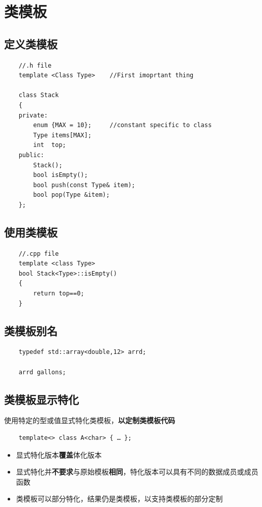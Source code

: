 \documentclass[UTF8,a4paper,12pt]{ctexbook}
\begin{document}
\section{类模板}
		\subsection{定义类模板}
			\begin{lstlisting}	
	//.h file		
	template <Class Type>    //First imoprtant thing
		
	class Stack
	{
	private:
		enum {MAX = 10};     //constant specific to class
		Type items[MAX];
		int  top;
	public:
		Stack();
		bool isEmpty();
		bool push(const Type& item);
		bool pop(Type &item);
	};		    
			\end{lstlisting}
				
				
		\subsection{使用类模板}
			\begin{lstlisting}	
	//.cpp file		
	template <class Type>
	bool Stack<Type>::isEmpty()
	{
		return top==0;
	}			
			\end{lstlisting}
			
		\subsection{类模板别名}
			\begin{lstlisting}			
	typedef std::array<double,12> arrd;
		
	arrd gallons;			
			\end{lstlisting}
	
	
		\subsection{类模板显示特化}
			使用特定的型或值显式特化类模板，\textbf{以定制类模板代码}
			
			\begin{lstlisting}
	template<> class A<char> { … };
			\end{lstlisting}

			\begin{itemize}
				\item 显式特化版本\textbf{覆盖}体化版本
				
				\item 显式特化并\textbf{不要求}与原始模板\textbf{相同}，特化版本可以具有不同的数据成员或成员函数
				
				\item 类模板可以部分特化，结果仍是类模板，以支持类模板的部分定制
			\end{itemize}
\end{document}
